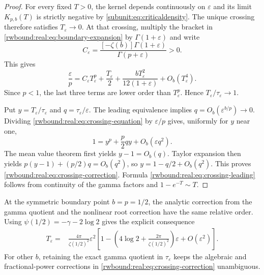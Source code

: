 \begin{proof}
For every fixed $T>0$, the kernel depends continuously on
$\varepsilon$ and its limit $K_{p,b}(T)$ is strictly negative by
\eqref{subunit:eq:criticaldensity}. The unique crossing therefore
satisfies $T_\varepsilon\to0$. At that crossing, multiply the
bracket in \eqref{rwbound:real:eq:boundary-expansion} by
$\Gamma(1+\varepsilon)$ and write
\[
 C_\varepsilon=
 \frac{[-\zeta(b)]\Gamma(1+\varepsilon)}{\Gamma(p+\varepsilon)}>0.
\]
This gives
\begin{equation}\label{rwbound:real:eq:crossing-equation}
 \frac{\varepsilon}{p}
 =C_\varepsilon T_\varepsilon^p+
   \frac{T_\varepsilon}{2}
   +\frac{bT_\varepsilon^2}{12(1+\varepsilon)}
   +O_b(T_\varepsilon^4).
\end{equation}
Since $p<1$, the last three terms are lower order than
$T_\varepsilon^p$. Hence
$T_\varepsilon/\tau_\varepsilon\to1$.

Put $y=T_\varepsilon/\tau_\varepsilon$ and
$q=\tau_\varepsilon/\varepsilon$.
The leading equivalence implies $q=O_b(\varepsilon^{b/p})\to0$.
Dividing \eqref{rwbound:real:eq:crossing-equation} by $\varepsilon/p$
gives, uniformly for $y$ near one,
\[
 1=y^p+\frac p2 qy+O_b(\varepsilon q^2).
\]
The mean value theorem first yields $y-1=O_b(q)$. Taylor expansion
then yields $p(y-1)+(p/2)q=O_b(q^2)$, so
$y=1-q/2+O_b(q^2)$. This proves
\eqref{rwbound:real:eq:crossing-correction}. Formula
\eqref{rwbound:real:eq:crossing-leading} follows from continuity of the
gamma factors and $1-e^{-T}\sim T$.
\end{proof}

At the symmetric boundary point $b=p=1/2$, the analytic correction
from the gamma quotient and the nonlinear root correction have the
same relative order. Using $\psi(1/2)=-\gamma-2\log2$ gives the
explicit consequence
\begin{equation}\label{rwbound:real:eq:half-boundary}
\begin{split}
 T_\varepsilon={}&\frac{4\pi}{\zeta(1/2)^2}\varepsilon^2
 \left[1-
 \left(4\log2+\frac{2\pi}{\zeta(1/2)^2}\right)\varepsilon
 +O(\varepsilon^2)\right].
\end{split}
\end{equation}
For other $b$, retaining the exact gamma quotient in
$\tau_\varepsilon$ keeps the algebraic and fractional-power
corrections in \eqref{rwbound:real:eq:crossing-correction} unambiguous.

